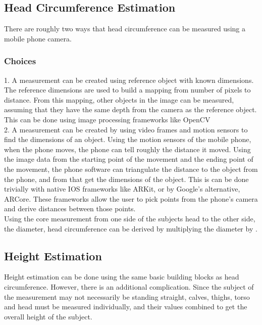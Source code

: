\documentclass[letterpaper,10pt,draftclsnofoot,onecolumn,compsoc]{IEEEtran}
\begin{document}
\subsection{Head Circumference Estimation} 

There are roughly two ways that head circumference can be measured using a mobile phone camera.\\

\subsubsection{Choices}
1. A measurement can be created using reference object with known dimensions. The reference dimensions are used to build a mapping from number of pixels to distance. From this mapping, other objects in the image can be measured, assuming that they have the same depth from the camera as the reference object. This can be done using image processing frameworks like OpenCV\\

2. A measurement can be created by using video frames and motion sensors to find the dimensions of an object. Using the motion sensors of the mobile phone, when the phone moves, the phone can tell roughly the distance it moved. Using the image data from the starting point of the movement and the ending point of the movement, the phone software can triangulate the distance to the object from the phone, and from that get the dimensions of the object. This is can be done trivially with native IOS frameworks like ARKit, or by Google's alternative, ARCore. These frameworks allow the user to pick points from the phone's camera and derive distances between those points.\\

Using the core measurement from one side of the subjects head to the other side, the diameter, head circumference can be derived by multiplying the diameter by \pi.

\subsection{Height Estimation}
Height estimation can be done using the same basic building blocks as head circumference. However, there is an additional complication. Since the subject of the measurement may not necessarily be standing straight, calves, thighs, torso and head must be measured individually, and their values combined to get the overall height of the subject.\\
\end{document}
